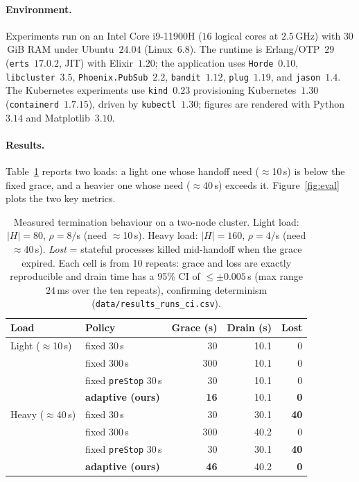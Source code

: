 \documentclass[AMA,Times1COL]{WileyNJDv5}
\begin{document}
\paragraph{Environment.} Experiments run on an Intel Core i9-11900H ($16$ logical cores at $2.5$\,GHz)
with $30$\,GiB RAM under Ubuntu~$24.04$ (Linux~$6.8$). The runtime is Erlang/OTP~$29$
(\texttt{erts}~$17.0.2$, JIT) with Elixir~$1.20$; the application uses \texttt{Horde}~$0.10$,
\texttt{libcluster}~$3.5$, \texttt{Phoenix.PubSub}~$2.2$, \texttt{bandit}~$1.12$, \texttt{plug}~$1.19$,
and \texttt{jason}~$1.4$. The Kubernetes experiments use \texttt{kind}~$0.23$ provisioning
Kubernetes~$1.30$ (\texttt{containerd}~$1.7.15$), driven by \texttt{kubectl}~$1.30$; figures are rendered
with Python~$3.14$ and Matplotlib~$3.10$.

\paragraph{Results.} Table~\ref{tab:eval} reports two loads: a light one whose handoff need
($\approx$10\,s) is below the fixed grace, and a heavier one whose need ($\approx$40\,s) exceeds it.
Figure~\ref{fig:eval} plots the two key metrics.

\begin{table}[t]
\centering
\caption{Measured termination behaviour on a two-node cluster. Light load: $|H|=80$, $\rho=8/$s
(need $\approx$10\,s). Heavy load: $|H|=160$, $\rho=4/$s (need $\approx$40\,s). \emph{Lost} = stateful
processes killed mid-handoff when the grace expired. Each cell is from 10 repeats: grace and
loss are exactly reproducible and drain time has a 95\% CI of $\le\pm0.005$\,s (max range $24$\,ms
over the ten repeats), confirming determinism (\texttt{data/results\_runs\_ci.csv}).}\label{tab:eval}
\begin{tabular}{@{}llrrr@{}}
\toprule
\textbf{Load} & \textbf{Policy} & \textbf{Grace (s)} & \textbf{Drain (s)} & \textbf{Lost} \\
\midrule
Light ($\approx$10\,s) & fixed 30\,s            & 30  & 10.1 & 0 \\
                       & fixed 300\,s           & 300 & 10.1 & 0 \\
                       & fixed \texttt{preStop} 30\,s & 30 & 10.1 & 0 \\
                       & \textbf{adaptive (ours)} & \textbf{16} & 10.1 & \textbf{0} \\
\midrule
Heavy ($\approx$40\,s) & fixed 30\,s            & 30  & 30.1 & \textbf{40} \\
                       & fixed 300\,s           & 300 & 40.2 & 0 \\
                       & fixed \texttt{preStop} 30\,s & 30 & 30.1 & \textbf{40} \\
                       & \textbf{adaptive (ours)} & \textbf{46} & 40.2 & \textbf{0} \\
\bottomrule
\end{tabular}
\end{table}
\end{document}
